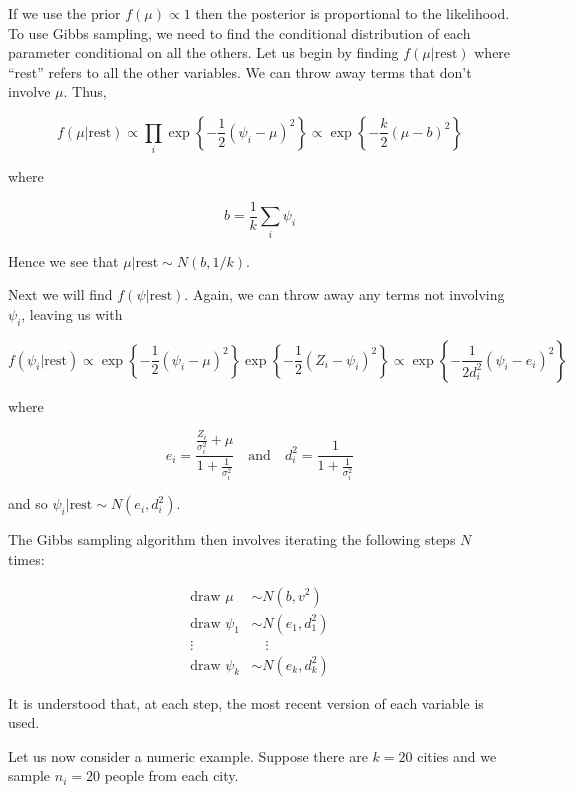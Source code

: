 If we use the prior \(f(\mu) \propto 1\) then the posterior is
proportional to the likelihood. To use Gibbs sampling, we need to find
the conditional distribution of each parameter conditional on all the
others. Let us begin by finding \(f(\mu | \text{rest})\) where ``rest''
refers to all the other variables. We can throw away terms that don't
involve \(\mu\). Thus,

\[ f(\mu | \text{rest}) \propto \prod_i \exp \left\{ -\frac{1}{2} (\psi_i - \mu)^2 \right\} \propto \exp \left\{ -\frac{k}{2} (\mu - b)^2 \right\} \]

where

\[ b = \frac{1}{k} \sum_i \psi_i \]

Hence we see that \(\mu | \text{rest} \sim N(b, 1 / k)\).

Next we will find \(f(\psi | \text{rest})\). Again, we can throw away
any terms not involving \(\psi_i\), leaving us with

\[ f(\psi_i | \text{rest}) \propto \exp \left\{-\frac{1}{2} (\psi_i - \mu)^2 \right\} \exp \left\{ -\frac{1}{2} (Z_i - \psi_i)^2 \right\} \propto \exp \left\{ -\frac{1}{2d_i^2}(\psi_i - e_i)^2 \right\} \]

where

\[ 
e_i = \frac{\frac{Z_i}{\sigma_i^2} + \mu}{1 + \frac{1}{\sigma_i^2}}
\quad \text{and} \quad
d_i^2 = \frac{1}{1 + \frac{1}{\sigma_i^2}}
\]

and so \(\psi_i | \text{rest} \sim N(e_i, d_i^2)\).

The Gibbs sampling algorithm then involves iterating the following steps
\(N\) times:

\[
\begin{align}
\text{draw } \mu &\sim N(b, v^2) \\
\text{draw } \psi_1 &\sim N(e_1, d_1^2) \\
\vdots & \quad \vdots \\
\text{draw } \psi_k &\sim N(e_k, d_k^2)
\end{align}
\]

It is understood that, at each step, the most recent version of each
variable is used.

Let us now consider a numeric example. Suppose there are \(k = 20\)
cities and we sample \(n_i = 20\) people from each city.

